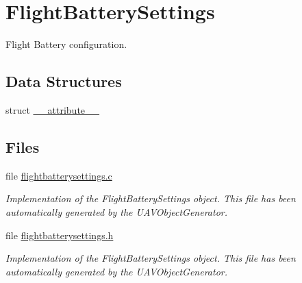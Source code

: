 \hypertarget{group___flight_battery_settings}{\section{\-Flight\-Battery\-Settings}
\label{group___flight_battery_settings}
}


\-Flight \-Battery configuration.  


\subsection*{\-Data \-Structures}
\begin{DoxyCompactItemize}
\item 
struct \hyperlink{struct____attribute____}{\-\_\-\-\_\-attribute\-\_\-\-\_\-}
\end{DoxyCompactItemize}
\subsection*{\-Files}
\begin{DoxyCompactItemize}
\item 
file \hyperlink{flightbatterysettings_8c}{flightbatterysettings.\-c}
\begin{DoxyCompactList}\small\item\em \-Implementation of the \-Flight\-Battery\-Settings object. \-This file has been automatically generated by the \-U\-A\-V\-Object\-Generator. \end{DoxyCompactList}\item 
file \hyperlink{flightbatterysettings_8h}{flightbatterysettings.\-h}
\begin{DoxyCompactList}\small\item\em \-Implementation of the \-Flight\-Battery\-Settings object. \-This file has been automatically generated by the \-U\-A\-V\-Object\-Generator. \end{DoxyCompactList}\end{DoxyCompactItemize}
